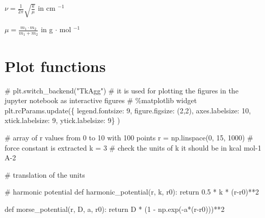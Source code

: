 \documentclass[
  letterpaper,
  DIV=11,
  numbers=noendperiod]{scrreprt}
\newenvironment{Shaded}{\begin{snugshade}}{\end{snugshade}}
\newcommand{\CommentTok}[1]{\textcolor[rgb]{0.37,0.37,0.37}{#1}}
\newcommand{\ControlFlowTok}[1]{\textcolor[rgb]{0.00,0.23,0.31}{#1}}
\newcommand{\DecValTok}[1]{\textcolor[rgb]{0.68,0.00,0.00}{#1}}
\newcommand{\FloatTok}[1]{\textcolor[rgb]{0.68,0.00,0.00}{#1}}
\newcommand{\KeywordTok}[1]{\textcolor[rgb]{0.00,0.23,0.31}{#1}}
\newcommand{\NormalTok}[1]{\textcolor[rgb]{0.00,0.23,0.31}{#1}}
\newcommand{\OperatorTok}[1]{\textcolor[rgb]{0.37,0.37,0.37}{#1}}
\newcommand{\StringTok}[1]{\textcolor[rgb]{0.13,0.47,0.30}{#1}}
\begin{document}
$\nu = \frac{1}{2\pi}\sqrt{\frac{k}{\mu}}$ in cm $^{-1}$

$\mu = \frac{m_1 \cdot m_2}{m_1 + m_2}$ in g $\cdot$ mol $^{-1}$

\hypertarget{plot-functions}{%
\section*{Plot functions}\label{plot-functions}}


\begin{Shaded}
\begin{Highlighting}[]
\CommentTok{\# plt.switch\_backend("TkAgg") }
\CommentTok{\# it is used for plotting the figures in the jupyter notebook as interactive figures}
\CommentTok{\# \%matplotlib widget}
\NormalTok{plt.rcParams.update(\{}
    \StringTok{\textquotesingle{}legend.fontsize\textquotesingle{}}\NormalTok{: }\DecValTok{9}\NormalTok{,}
    \StringTok{\textquotesingle{}figure.figsize\textquotesingle{}}\NormalTok{: (}\DecValTok{2}\NormalTok{,}\DecValTok{2}\NormalTok{),}
    \StringTok{\textquotesingle{}axes.labelsize\textquotesingle{}}\NormalTok{: }\DecValTok{10}\NormalTok{,}
    \StringTok{\textquotesingle{}xtick.labelsize\textquotesingle{}}\NormalTok{: }\DecValTok{9}\NormalTok{,}
    \StringTok{\textquotesingle{}ytick.labelsize\textquotesingle{}}\NormalTok{: }\DecValTok{9}\NormalTok{\}}
\NormalTok{)}

\CommentTok{\# array of r values from 0 to 10 with 100 points}
\NormalTok{r }\OperatorTok{=}\NormalTok{ np.linspace(}\DecValTok{0}\NormalTok{, }\DecValTok{15}\NormalTok{, }\DecValTok{1000}\NormalTok{)}
\CommentTok{\# force constant is extracted}
\NormalTok{k }\OperatorTok{=} \DecValTok{3} \CommentTok{\# check the units of k it should be in kcal mol{-}1 A{-}2}

\CommentTok{\# translation of the units}



\CommentTok{\# harmonic potential}
\KeywordTok{def}\NormalTok{ harmonic\_potential(r, k, r0):}
    \ControlFlowTok{return} \FloatTok{0.5} \OperatorTok{*}\NormalTok{ k }\OperatorTok{*}\NormalTok{ (r}\OperatorTok{{-}}\NormalTok{r0)}\OperatorTok{**}\DecValTok{2}

\KeywordTok{def}\NormalTok{ morse\_potential(r, D, a, r0):}
    \ControlFlowTok{return}\NormalTok{ D }\OperatorTok{*}\NormalTok{ (}\DecValTok{1} \OperatorTok{{-}}\NormalTok{ np.exp(}\OperatorTok{{-}}\NormalTok{a}\OperatorTok{*}\NormalTok{(r}\OperatorTok{{-}}\NormalTok{r0)))}\OperatorTok{**}\DecValTok{2}






\end{Highlighting}
\end{Shaded}
\end{document}
